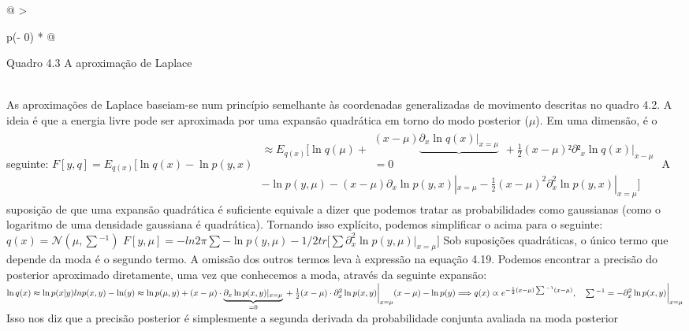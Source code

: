\documentclass[
  12pt,
]{book}
\begin{document}
\begin{longtable}[]{@{}
  >{\raggedright\arraybackslash}p{(\columnwidth - 0\tabcolsep) * }@{}}
\toprule
\begin{minipage}[b]{\linewidth}\raggedright
Quadro 4.3 A aproximação de Laplace
\end{minipage} \\
\midrule
\endhead
As aproximações de Laplace baseiam-se num princípio semelhante às coordenadas generalizadas de movimento descritas no quadro 4.2. A ideia é que a energia livre pode ser aproximada por uma expansão quadrática em torno do modo posterior (\(\mu\)). Em uma dimensão, é o seguinte: \( \begin{equation} F[y,q]= E_{q(x)}[\ln q(x) - \ln p(y,x) \end{equation}\) \( \begin{aligned}  \approx E_{q(x)} [ \ln q(\mu) + 
\begin{matrix}
(x-\mu)\underbrace {\partial_x \ln q(x)|_{x=\mu}}\\{=0}  
\end{matrix} + 
\frac{1}{2}(x-\mu)²\partial²_x \ln q(x)|_{x-\mu}  \\
-\ln p(y,\mu)-(x-\mu)\partial_x \ln p(y,x)|_{x=\mu} 
- \frac{1}{2}(x-\mu)^2\partial_x^2\ln p(y,x)|_{x=\mu}]
\end{aligned}\) A suposição de que uma expansão quadrática é suficiente equivale a dizer que podemos tratar as probabilidades como gaussianas (como o logaritmo de uma densidade gaussiana é quadrática). Tornando isso explícito, podemos simplificar o acima para o seguinte: \(q(x)=\mathcal{N}(\mu,\sum{}^{-1} )\) \(F[y,\mu]= -ln 2\pi\sum-\ln p(y,\mu)-1/2tr\bigg[\sum \partial_x^2 \ln p (y,\mu)\bigg|_{x=\mu} \bigg]\) Sob suposições quadráticas, o único termo que depende da moda é o segundo termo. A omissão dos outros termos leva à expressão na equação 4.19. Podemos encontrar a precisão do posterior aproximado diretamente, uma vez que conhecemos a moda, através da seguinte expansão: \( \begin{equation} 
\ln q(x) \approx \ln p(x|y) 
\\ ln p(x,y) - \ln (y)
\\ \approx \ln p(\mu, y) + (x - \mu) \cdot \underbrace{\partial_x\ln p(x,y)|_{x=\mu}}_{=0} 
\\ + \frac{1}{2} (x-\mu)\cdot \partial_x^2 \ln p(x,y)\bigg|_{x=\mu}(x-\mu)-\ln p(y)
\\ \Longrightarrow q(x) \varpropto e^{-\frac{1}{2}(x-\mu)\sum{}^{-1}(x-\mu)} , \quad \sum{}^{-1}=-\partial^2_x \ln p(x,y)\bigg|_{x=\mu}
\end{equation} \) Isso nos diz que a precisão posterior é simplesmente a segunda derivada da probabilidade conjunta avaliada na moda posterior \\
\bottomrule
\end{longtable}
\end{document}
